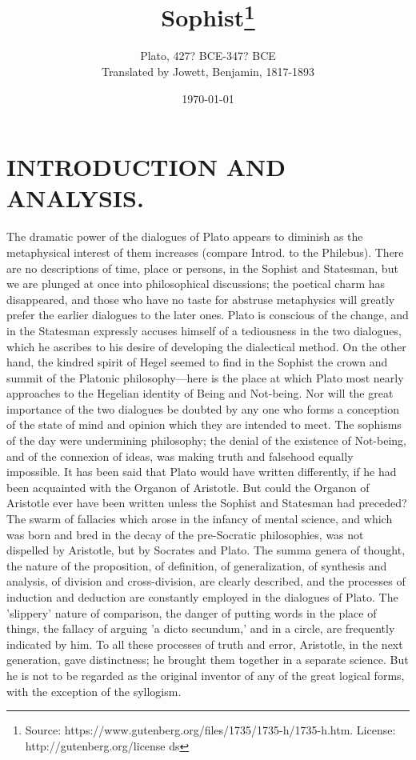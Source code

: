 \documentclass[11pt,letter]{article}
\begin{document}
\title{Sophist\thanks{Source: https://www.gutenberg.org/files/1735/1735-h/1735-h.htm. License: http://gutenberg.org/license ds}}
\date{\today}
\author{Plato, 427? BCE-347? BCE\\ Translated by Jowett, Benjamin, 1817-1893}
\maketitle

\setcounter{tocdepth}{1}
\tableofcontents
\renewcommand{\baselinestretch}{1.0}
\normalsize
\newpage

\section{
      INTRODUCTION AND ANALYSIS.
    }
\par  The dramatic power of the dialogues of Plato appears to diminish as the metaphysical interest of them increases (compare Introd. to the Philebus). There are no descriptions of time, place or persons, in the Sophist and Statesman, but we are plunged at once into philosophical discussions; the poetical charm has disappeared, and those who have no taste for abstruse metaphysics will greatly prefer the earlier dialogues to the later ones. Plato is conscious of the change, and in the Statesman expressly accuses himself of a tediousness in the two dialogues, which he ascribes to his desire of developing the dialectical method. On the other hand, the kindred spirit of Hegel seemed to find in the Sophist the crown and summit of the Platonic philosophy—here is the place at which Plato most nearly approaches to the Hegelian identity of Being and Not-being. Nor will the great importance of the two dialogues be doubted by any one who forms a conception of the state of mind and opinion which they are intended to meet. The sophisms of the day were undermining philosophy; the denial of the existence of Not-being, and of the connexion of ideas, was making truth and falsehood equally impossible. It has been said that Plato would have written differently, if he had been acquainted with the Organon of Aristotle. But could the Organon of Aristotle ever have been written unless the Sophist and Statesman had preceded? The swarm of fallacies which arose in the infancy of mental science, and which was born and bred in the decay of the pre-Socratic philosophies, was not dispelled by Aristotle, but by Socrates and Plato. The summa genera of thought, the nature of the proposition, of definition, of generalization, of synthesis and analysis, of division and cross-division, are clearly described, and the processes of induction and deduction are constantly employed in the dialogues of Plato. The 'slippery' nature of comparison, the danger of putting words in the place of things, the fallacy of arguing 'a dicto secundum,' and in a circle, are frequently indicated by him. To all these processes of truth and error, Aristotle, in the next generation, gave distinctness; he brought them together in a separate science. But he is not to be regarded as the original inventor of any of the great logical forms, with the exception of the syllogism.
\end{document}
